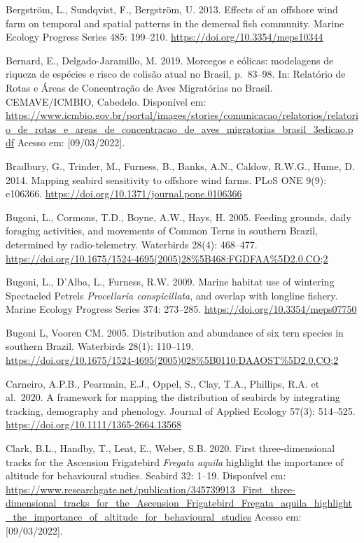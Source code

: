\documentclass[
  oneside]{scrbook}
\begin{document}
Bergström, L., Sundqvist, F., Bergström, U. 2013. Effects of an offshore wind farm on temporal and spatial patterns in the demersal fish community. Marine Ecology Progress Series 485: 199--210. \url{https://doi.org/10.3354/meps10344}

Bernard, E., Delgado-Jaramillo, M. 2019. Morcegos e eólicas: modelagens de riqueza de espécies e risco de colisão atual no Brasil, p.~83--98. In: Relatório de Rotas e Áreas de Concentração de Aves Migratórias no Brasil. CEMAVE/ICMBIO, Cabedelo. Disponível em: \url{https://www.icmbio.gov.br/portal/images/stories/comunicacao/relatorios/relatorio_de_rotas_e_areas_de_concentracao_de_aves_migratorias_brasil_3edicao.pdf} Acesso em: {[}09/03/2022{]}.

Bradbury, G., Trinder, M., Furness, B., Banks, A.N., Caldow, R.W.G., Hume, D. 2014. Mapping seabird sensitivity to offshore wind farms. PLoS ONE 9(9): e106366. \url{https://doi.org/10.1371/journal.pone.0106366}

Bugoni, L., Cormons, T.D., Boyne, A.W., Hays, H. 2005. Feeding grounds, daily foraging activities, and movements of Common Terns in southern Brazil, determined by radio-telemetry. Waterbirds 28(4): 468--477. \url{https://doi.org/10.1675/1524-4695(2005)28\%5B468:FGDFAA\%5D2.0.CO;2}

Bugoni, L., D'Alba, L., Furness, R.W. 2009. Marine habitat use of wintering Spectacled Petrels \emph{Procellaria conspicillata}, and overlap with longline fishery. Marine Ecology Progress Series 374: 273--285. \url{https://doi.org/10.3354/meps07750}

Bugoni L, Vooren CM. 2005. Distribution and abundance of six tern species in southern Brazil. Waterbirds 28(1): 110--119.\\
\url{https://doi.org/10.1675/1524-4695(2005)028\%5B0110:DAAOST\%5D2.0.CO;2}

Carneiro, A.P.B., Pearmain, E.J., Oppel, S., Clay, T.A., Phillips, R.A. et al.~2020. A framework for mapping the distribution of seabirds by integrating tracking, demography and phenology. Journal of Applied Ecology 57(3): 514--525. \url{https://doi.org/10.1111/1365-2664.13568}

Clark, B.L., Handby, T., Leat, E., Weber, S.B. 2020. First three-dimensional tracks for the Ascension Frigatebird \emph{Fregata aquila} highlight the importance of altitude for behavioural studies. Seabird 32: 1--19. Disponível em: \url{https://www.researchgate.net/publication/345739913_First_three-dimensional_tracks_for_the_Ascension_Frigatebird_Fregata_aquila_highlight_the_importance_of_altitude_for_behavioural_studies} Acesso em: {[}09/03/2022{]}.
\end{document}
